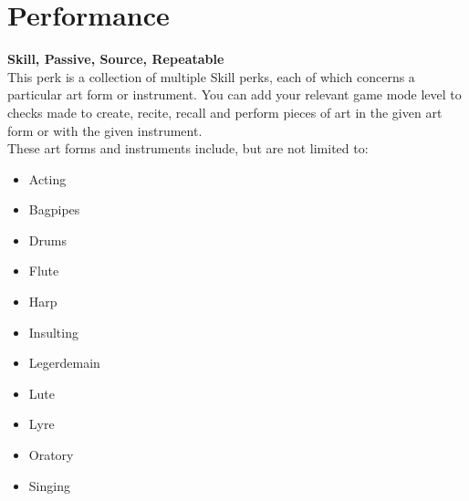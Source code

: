 \section{Performance}\label{sec:performance}
\textbf{Skill, Passive, Source, Repeatable}\\
This perk is a collection of multiple Skill perks, each of which concerns a particular art form or instrument.
You can add your relevant game mode level to checks made to create, recite, recall and perform pieces of art in the given art form or with the given instrument.\\
These art forms and instruments include, but are not limited to:\\

\begin{itemize}
    \item Acting
    \item Bagpipes
    \item Drums
    \item Flute
    \item Harp
    \item Insulting
    \item Legerdemain
    \item Lute
    \item Lyre
    \item Oratory
    \item Singing
\end{itemize}